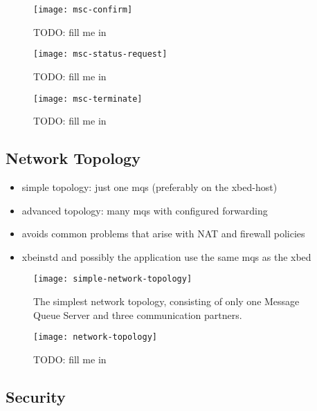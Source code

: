 \begin{figure}[ht]
  \centering
  \texttt{[image: msc-confirm]}
  \caption[MSC Confirm Reservation]{TODO: fill me in}
  \label{fig:msc-confirm}
\end{figure}

\begin{figure}[ht]
  \centering
  \texttt{[image: msc-status-request]}
  \caption[MSC Request Task Status]{TODO: fill me in}
  \label{fig:msc-status-request}
\end{figure}

\begin{figure}[ht]
  \centering
  \texttt{[image: msc-terminate]}
  \caption[MSC Terminate Task Request]{TODO: fill me in}
  \label{fig:msc-terminate}
\end{figure}

\subsection{Network Topology}
\label{sec:network-topology}

\begin{itemize}
\item simple topology: just one mqs (preferably on the xbed-host)
\item advanced topology: many mqs with configured forwarding
\item avoids common problems that arise with NAT and firewall policies
\item xbeinstd and possibly the application use the same mqs as the xbed
\end{itemize}

\begin{figure}[ht]
  \centering
  \texttt{[image: simple-network-topology]}
  \caption[Network  Topology   (simple)]{The  simplest  network  topology,
    consisting of  only one Message  Queue Server and  three communication
    partners.}
  \label{fig:simple-net-top}
\end{figure}

\begin{figure}[ht]
  \centering
  \texttt{[image: network-topology]}
  \caption[Network  Topology]{TODO: fill me in}
  \label{fig:net-top}
\end{figure}

\subsection{Security}
\label{sec:security}

